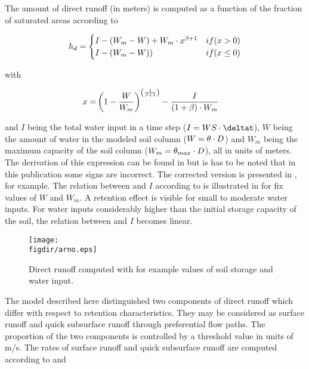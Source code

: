 The amount of direct runoff \heightRunoffDirect{} (in meters) is computed as a function of the fraction of saturated areas \satFrac{} according to 

\begin{align*}
  h_{d}=
  \begin{cases}
    I - (W_m - W) + W_m \cdot x^{{\beta}+1}  & if (x > 0) \\
    I - (W_m - W)) & if (x \le 0)
  \end{cases}
\end{align*}

with

\begin{align} \label{eqn:runGen4comp_surfaceDirect}
  x=& \left(1-\frac{W}{W_m}\right)^{\left(\frac{1}{{\beta}+1}\right)} - \frac{I}{(1+{\beta}) \cdot W_m}
\end{align}

and $I$ being the total water input in a time step ($I= \rateWaterSupply \cdot \deltat$), $W$ being the amount of water in the modeled soil column ($W= \theta \cdot D$) and $W_m$ being the maximum capacity of the soil column ($W_m= \theta_{max} \cdot D$), all in units of meters. The derivation of this expression can be found in \citet{Todini1996} but is has to be noted that in this publication some signs are incorrect. The corrected version is presented in \citet{Bremicker2006}, for example. The relation between \heightRunoffDirect{} and $I$ according to  is illustrated in  for fix values of $W$ and $W_m$. A retention effect is visible for small to moderate water inputs. For water inputs considerably higher than the initial storage capacity of the soil, the relation between \heightRunoffDirect{} and $I$ becomes linear.

\begin{figure}
  \texttt{[image: \\figdir/arno.eps]}
  \caption{Direct runoff computed with  for example values of soil storage and water input. \label{fig:runGen4comp_directRunoffHeight}}
\end{figure}

The model described here distinguished two components of direct runoff which differ with respect to retention characteristics. They may be considered as surface runoff and quick subsurface runoff through preferential flow paths. The proportion of the two components is controlled by a threshold value \thresholdSurf{} in units of m/s. The rates of surface runoff and quick subsurface runoff are computed according to  and 

